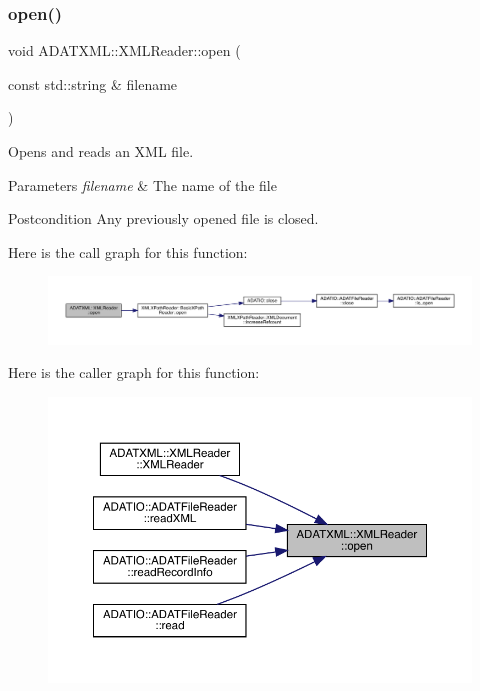\subsubsection{\texorpdfstring{open()}{open()}\hspace{0.1cm}{\footnotesize\ttfamily [1/6]}}
{\footnotesize\ttfamily void A\+D\+A\+T\+X\+M\+L\+::\+X\+M\+L\+Reader\+::open (\begin{DoxyParamCaption}\item[{const std\+::string \&}]{filename }\end{DoxyParamCaption})\hspace{0.3cm}{\ttfamily [inline]}}



Opens and reads an X\+ML file. 


\begin{DoxyParams}{Parameters}
{\em filename} & The name of the file \\
\hline
\end{DoxyParams}
\begin{DoxyPostcond}{Postcondition}
Any previously opened file is closed. 
\end{DoxyPostcond}
Here is the call graph for this function\+:
\nopagebreak
\begin{figure}[H]
\begin{center}
\leavevmode
\includegraphics[width=350pt]{db/d3f/classADATXML_1_1XMLReader_ad5dcbd08800bc67ac4a91f93cb1504b0_cgraph}
\end{center}
\end{figure}
Here is the caller graph for this function\+:
\nopagebreak
\begin{figure}[H]
\begin{center}
\leavevmode
\includegraphics[width=350pt]{db/d3f/classADATXML_1_1XMLReader_ad5dcbd08800bc67ac4a91f93cb1504b0_icgraph}
\end{center}
\end{figure}
\mbox{\label{classADATXML_1_1XMLReader_ad5dcbd08800bc67ac4a91f93cb1504b0}} 
